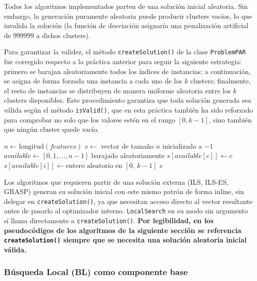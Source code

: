 \documentclass[a4paper,12pt]{article}%
\begin{document}
\noindent Todos los algoritmos implementados parten de una solución inicial aleatoria. Sin embargo, la generación puramente aleatoria puede producir clusters vacíos, lo que invalida la solución (la función de desviación asignaría una penalización artificial de $999999$ a dichos clusters).

Para garantizar la validez, el método \texttt{createSolution()} de la clase \texttt{ProblemPAR} fue corregido respecto a la práctica anterior para seguir la siguiente estrategia: primero se barajan aleatoriamente todos los índices de instancias; a continuación, se asigna de forma forzada una instancia a cada uno de los $k$ clusters; finalmente, el resto de instancias se distribuyen de manera uniforme aleatoria entre los $k$ clusters disponibles. Este procedimiento garantiza que toda solución generada sea válida según el método \texttt{isValid()}, que en esta práctica también ha sido reforzado para comprobar no solo que los valores estén en el rango $[0, k-1]$, sino también que ningún cluster quede vacío.

\begin{algorithm}[H]
	\begin{algorithmic}
		\State $n \leftarrow \text{longitud}(features)$
		\State $s \leftarrow$ vector de tamaño $n$ inicializado a $-1$
		\State $\textit{available} \leftarrow [0, 1, \ldots, n-1]$ barajado aleatoriamente
		\State $s[\textit{available}[c]] \leftarrow c$ 
		\EndFor
		\State $s[\textit{available}[i]] \leftarrow \text{entero aleatorio en } [0,\, k-1]$
		\EndFor
		\State \Return $s$
		\EndFunction
	\end{algorithmic}
\end{algorithm}

\noindent Los algoritmos que requieren partir de una solución externa (ILS, ILS-ES, GRASP) generan su solución inicial con este mismo patrón de forma inline, sin delegar en \texttt{createSolution()}, ya que necesitan acceso directo al vector resultante antes de pasarlo al optimizador interno. \texttt{LocalSearch} en su modo sin argumento sí llama directamente a \texttt{createSolution()}. \textbf{Por legibilidad, en los pseudocódigos de los algoritmos de la siguiente sección se referencia \texttt{createSolution()} siempre que se necesita una solución aleatoria inicial válida.}

\subsubsection*{Búsqueda Local (BL) como componente base}
\end{document}
